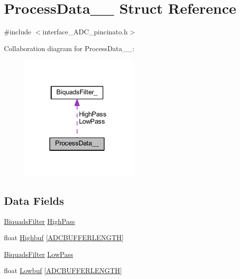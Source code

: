 \hypertarget{struct_process_data____}{}\section{Process\+Data\+\_\+\+\_\+ Struct Reference}
\label{struct_process_data____}


{\ttfamily \#include $<$interface\+\_\+\+A\+D\+C\+\_\+pincinato.\+h$>$}



Collaboration diagram for Process\+Data\+\_\+\+\_\+\+:\nopagebreak
\begin{figure}[H]
\begin{center}
\leavevmode
\includegraphics[width=168pt]{struct_process_data______coll__graph}
\end{center}
\end{figure}
\subsection*{Data Fields}
\begin{DoxyCompactItemize}
\item 
\mbox{\hyperlink{filter__math__pincinato_8h_a431282902bc1cfeb168d1acf574331bb}{Biquads\+Filter}} \mbox{\hyperlink{struct_process_data_____af13bc04872597bbd10728a615e35f0a8}{High\+Pass}}
\item 
float \mbox{\hyperlink{struct_process_data_____a4c0a993848fc70e7ee3eb5e55bf88fa2}{Highbuf}} \mbox{[}\mbox{\hyperlink{interface___a_d_c__pincinato_8h_a2ddc9b0b00b7c686d5208fc298aeadb2}{A\+D\+C\+B\+U\+F\+F\+E\+R\+L\+E\+N\+G\+TH}}\mbox{]}
\item 
\mbox{\hyperlink{filter__math__pincinato_8h_a431282902bc1cfeb168d1acf574331bb}{Biquads\+Filter}} \mbox{\hyperlink{struct_process_data_____aed3be52a787eac3e0d0981dd8c2bb8a0}{Low\+Pass}}
\item 
float \mbox{\hyperlink{struct_process_data_____a5e4aeedf9f04a1d8ee5bad2b8e0bf8af}{Lowbuf}} \mbox{[}\mbox{\hyperlink{interface___a_d_c__pincinato_8h_a2ddc9b0b00b7c686d5208fc298aeadb2}{A\+D\+C\+B\+U\+F\+F\+E\+R\+L\+E\+N\+G\+TH}}\mbox{]}
\end{DoxyCompactItemize}


